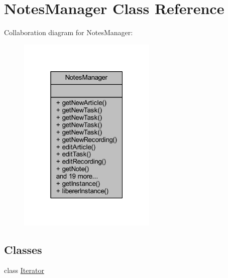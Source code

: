 \hypertarget{class_notes_manager}{}\section{Notes\+Manager Class Reference}
\label{class_notes_manager}


Collaboration diagram for Notes\+Manager\+:\nopagebreak
\begin{figure}[H]
\begin{center}
\leavevmode
\includegraphics[width=187pt]{class_notes_manager__coll__graph}
\end{center}
\end{figure}
\subsection*{Classes}
\begin{DoxyCompactItemize}
\item 
class \hyperlink{class_notes_manager_1_1_iterator}{Iterator}
\end{DoxyCompactItemize}
